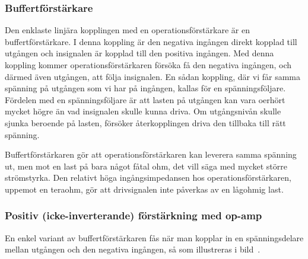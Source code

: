 \subsubsection{Buffertförstärkare}

Den enklaste linjära kopplingen med en operationsförstärkare är en
buffertförstärkare.
I denna koppling är den negativa ingången direkt kopplad till utgången och
insignalen är kopplad till den positiva ingången.
Med denna koppling kommer operationsförstärkaren försöka få den negativa
ingången, och därmed även utgången, att följa insignalen.
En sådan koppling, där vi får samma spänning på utgången som vi har på
ingången, kallas för en spänningsföljare.
Fördelen med en spänningsföljare är att lasten på utgången kan vara oerhört
mycket högre än vad insignalen skulle kunna driva.
Om utgångsnivån skulle sjunka beroende på lasten, försöker återkopplingen driva
den tillbaka till rätt spänning.

Buffertförstärkaren gör att operationsförstärkaren kan leverera samma spänning
ut, men mot en last på bara något fåtal ohm, det vill säga med mycket större
strömstyrka.
Den relativt höga ingångsimpedansen hos operationsförstärkaren, uppemot en
teraohm, gör att drivsignalen inte påverkas av en lågohmig last.

\subsubsection{Positiv (icke-inverterande) förstärkning med op-amp}
\label{icke-inverterande förstärkning}

En enkel variant av buffertförstärkaren fås när man kopplar in en
spänningsdelare mellan utgången och den negativa ingången, så som illustreras i
bild~.



